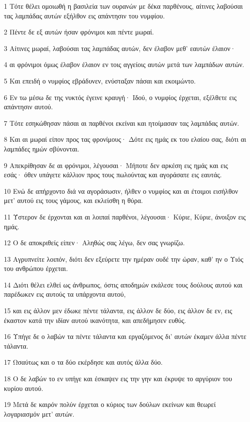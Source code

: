 \par 1 Τότε θέλει ομοιωθή η βασιλεία των ουρανών με δέκα παρθένους, αίτινες λαβούσαι τας λαμπάδας αυτών εξήλθον εις απάντησιν του νυμφίου.
\par 2 Πέντε δε εξ αυτών ήσαν φρόνιμοι και πέντε μωραί.
\par 3 Αίτινες μωραί, λαβούσαι τας λαμπάδας αυτών, δεν έλαβον μεθ' εαυτών έλαιον·
\par 4 αι φρόνιμοι όμως έλαβον έλαιον εν τοις αγγείοις αυτών μετά των λαμπάδων αυτών.
\par 5 Και επειδή ο νυμφίος εβράδυνεν, ενύσταξαν πάσαι και εκοιμώντο.
\par 6 Εν τω μέσω δε της νυκτός έγεινε κραυγή· Ιδού, ο νυμφίος έρχεται, εξέλθετε εις απάντησιν αυτού.
\par 7 Τότε εσηκώθησαν πάσαι αι παρθένοι εκείναι και ητοίμασαν τας λαμπάδας αυτών.
\par 8 Και αι μωραί είπον προς τας φρονίμους· Δότε εις ημάς εκ του ελαίου σας, διότι αι λαμπάδες ημών σβύνονται.
\par 9 Απεκρίθησαν δε αι φρόνιμοι, λέγουσαι· Μήποτε δεν αρκέση εις ημάς και εις εσάς· όθεν υπάγετε κάλλιον προς τους πωλούντας και αγοράσατε εις εαυτάς.
\par 10 Ενώ δε απήρχοντο διά να αγοράσωσιν, ήλθεν ο νυμφίος και αι έτοιμοι εισήλθον μετ' αυτού εις τους γάμους, και εκλείσθη η θύρα.
\par 11 Ύστερον δε έρχονται και αι λοιπαί παρθένοι, λέγουσαι· Κύριε, Κύριε, άνοιξον εις ημάς.
\par 12 Ο δε αποκριθείς είπεν· Αληθώς σας λέγω, δεν σας γνωρίζω.
\par 13 Αγρυπνείτε λοιπόν, διότι δεν εξεύρετε την ημέραν ουδέ την ώραν, καθ' ην ο Υιός του ανθρώπου έρχεται.
\par 14 Διότι θέλει ελθεί ως άνθρωπος, όστις αποδημών εκάλεσε τους δούλους αυτού και παρέδωκεν εις αυτούς τα υπάρχοντα αυτού,
\par 15 και εις άλλον μεν έδωκε πέντε τάλαντα, εις άλλον δε δύο, εις άλλον δε εν, εις έκαστον κατά την ιδίαν αυτού ικανότητα, και απεδήμησεν ευθύς.
\par 16 Υπήγε δε ο λαβών τα πέντε τάλαντα και εργαζόμενος δι' αυτών έκαμεν άλλα πέντε τάλαντα.
\par 17 Ωσαύτως και ο τα δύο εκέρδησε και αυτός άλλα δύο.
\par 18 Ο δε λαβών το εν υπήγε και έσκαψεν εις την γην και έκρυψε το αργύριον του κυρίου αυτού.
\par 19 Μετά δε καιρόν πολύν έρχεται ο κύριος των δούλων εκείνων και θεωρεί λογαριασμόν μετ' αυτών.
